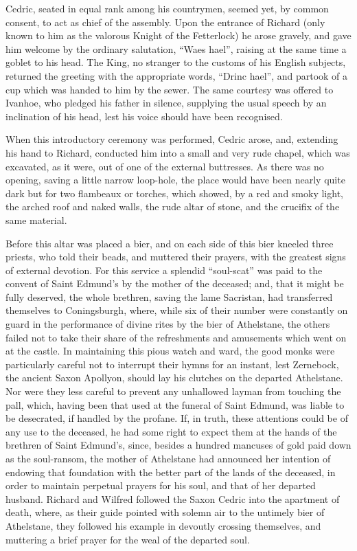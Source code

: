 Cedric, seated in equal rank among his countrymen, seemed yet, by common
consent, to act as chief of the assembly. Upon the entrance of Richard
(only known to him as the valorous Knight of the Fetterlock) he arose
gravely, and gave him welcome by the ordinary salutation, ``Waes hael'',
raising at the same time a goblet to his head. The King, no stranger to
the customs of his English subjects, returned the greeting with the
appropriate words, ``Drinc hael'', and partook of a cup which was handed
to him by the sewer. The same courtesy was offered to Ivanhoe, who
pledged his father in silence, supplying the usual speech by an
inclination of his head, lest his voice should have been recognised.

When this introductory ceremony was performed, Cedric arose, and,
extending his hand to Richard, conducted him into a small and very rude
chapel, which was excavated, as it were, out of one of the external
buttresses. As there was no opening, saving a little narrow loop-hole,
the place would have been nearly quite dark but for two flambeaux or
torches, which showed, by a red and smoky light, the arched roof and
naked walls, the rude altar of stone, and the crucifix of the same
material.

Before this altar was placed a bier, and on each side of this bier
kneeled three priests, who told their beads, and muttered their prayers,
with the greatest signs of external devotion. For this service a
splendid ``soul-scat'' was paid to the convent of Saint Edmund's by the
mother of the deceased; and, that it might be fully deserved, the whole
brethren, saving the lame Sacristan, had transferred themselves to
Coningsburgh, where, while six of their number were constantly on guard
in the performance of divine rites by the bier of Athelstane, the others
failed not to take their share of the refreshments and amusements which
went on at the castle. In maintaining this pious watch and ward, the
good monks were particularly careful not to interrupt their hymns for an
instant, lest Zernebock, the ancient Saxon Apollyon, should lay his
clutches on the departed Athelstane. Nor were they less careful to
prevent any unhallowed layman from touching the pall, which, having been
that used at the funeral of Saint Edmund, was liable to be desecrated,
if handled by the profane. If, in truth, these attentions could be of
any use to the deceased, he had some right to expect them at the hands
of the brethren of Saint Edmund's, since, besides a hundred mancuses of
gold paid down as the soul-ransom, the mother of Athelstane had
announced her intention of endowing that foundation with the better part
of the lands of the deceased, in order to maintain perpetual prayers for
his soul, and that of her departed husband. Richard and Wilfred followed
the Saxon Cedric into the apartment of death, where, as their guide
pointed with solemn air to the untimely bier of Athelstane, they
followed his example in devoutly crossing themselves, and muttering a
brief prayer for the weal of the departed soul.

